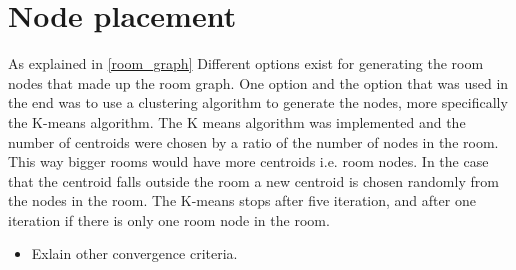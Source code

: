 \section{Node placement}
As explained in \ref{room_graph} Different options exist for generating the room nodes that made up the room graph. One option and the option that was used in the end was to use a clustering algorithm to generate the nodes, more specifically the K-means algorithm. 
The K means algorithm was implemented and the number of centroids were chosen by a ratio of the number of nodes in the room. This way bigger rooms would have more centroids i.e. room nodes. In the case that the centroid falls outside the room a new centroid is chosen randomly from the nodes in the room. The K-means stops after five iteration, and after one iteration if there is only one room node in the room. 

\begin{itemize}
    \item Exlain other convergence criteria.
\end{itemize}






